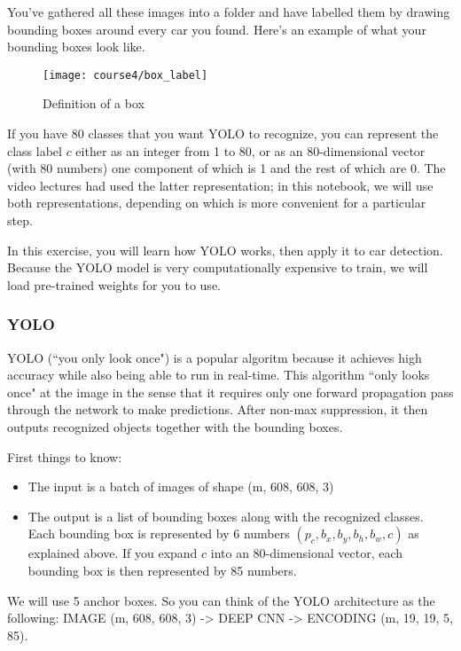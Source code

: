 You've gathered all these images into a folder and have labelled them by drawing bounding boxes around every car you found. Here's an example of what your bounding boxes look like.
\begin{figure}[h]
\begin{center}
\texttt{[image: course4/box\_label]}
\caption{Definition of a box}
\end{center}
\end{figure}

If you have 80 classes that you want YOLO to recognize, you can represent the class label  $c$  either as an integer from 1 to 80, or as an 80-dimensional vector (with 80 numbers) one component of which is 1 and the rest of which are 0. The video lectures had used the latter representation; in this notebook, we will use both representations, depending on which is more convenient for a particular step.

In this exercise, you will learn how YOLO works, then apply it to car detection. Because the YOLO model is very computationally expensive to train, we will load pre-trained weights for you to use.


\subsubsection{YOLO}
YOLO (``you only look once") is a popular algoritm because it achieves high accuracy while also being able to run in real-time. This algorithm ``only looks once" at the image in the sense that it requires only one forward propagation pass through the network to make predictions. After non-max suppression, it then outputs recognized objects together with the bounding boxes.


First things to know:
\begin{itemize}
\item The input is a batch of images of shape (m, 608, 608, 3)
\item The output is a list of bounding boxes along with the recognized classes. Each bounding box is represented by 6 numbers  $(p_c,b_x,b_y,b_h,b_w,c)$ as explained above. If you expand  $c$  into an 80-dimensional vector, each bounding box is then represented by 85 numbers.
\end{itemize}

We will use 5 anchor boxes. So you can think of the YOLO architecture as the following: IMAGE (m, 608, 608, 3) -> DEEP CNN -> ENCODING (m, 19, 19, 5, 85).

